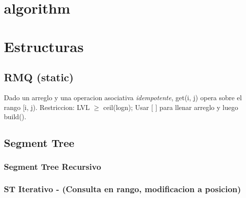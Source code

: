 

\def\title{Super Nintendo Chalmers - nope}
\tableofcontents\newpage
 
\section{algorithm}%



\section{Estructuras}%
\subsection{RMQ (static)}
Dado un arreglo y una operacion asociativa \emph{idempotente}, get(i, j) opera sobre el rango [i, j). Restriccion: LVL $\ge$ ceil(logn); Usar [ ] para llenar arreglo y luego build().

\subsection{Segment Tree}
\subsubsection{Segment Tree Recursivo}

\subsubsection{ST Iterativo - (Consulta en rango, modificacion a posicion)}
